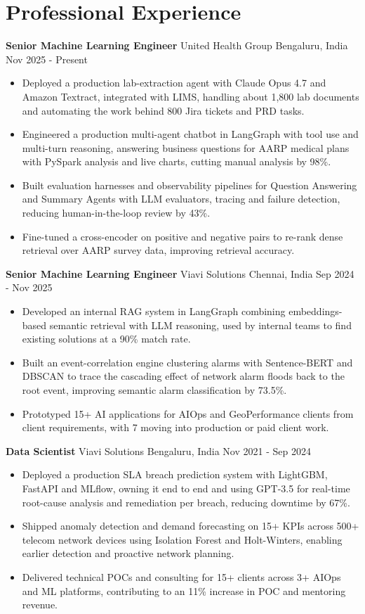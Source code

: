 \documentclass[10pt,a4paper]{article}
\newcommand{\role}[4]{\textbf{#1} \textbar{} #2 \hfill #3 \textbar{} #4\par}
\begin{document}
\section{Professional Experience}
\role{Senior Machine Learning Engineer}{United Health Group}{Bengaluru, India}{Nov 2025 - Present}
\begin{itemize}
  \item Deployed a production lab-extraction agent with Claude Opus 4.7 and Amazon Textract, integrated with LIMS, handling about 1,800 lab documents and automating the work behind 800 Jira tickets and PRD tasks.
  \item Engineered a production multi-agent chatbot in LangGraph with tool use and multi-turn reasoning, answering business questions for AARP medical plans with PySpark analysis and live charts, cutting manual analysis by 98\%.
  \item Built evaluation harnesses and observability pipelines for Question Answering and Summary Agents with LLM evaluators, tracing and failure detection, reducing human-in-the-loop review by 43\%.
  \item Fine-tuned a cross-encoder on positive and negative pairs to re-rank dense retrieval over AARP survey data, improving retrieval accuracy.
\end{itemize}
\vspace{3pt}
\role{Senior Machine Learning Engineer}{Viavi Solutions}{Chennai, India}{Sep 2024 - Nov 2025}
\begin{itemize}
  \item Developed an internal RAG system in LangGraph combining embeddings-based semantic retrieval with LLM reasoning, used by internal teams to find existing solutions at a 90\% match rate.
  \item Built an event-correlation engine clustering alarms with Sentence-BERT and DBSCAN to trace the cascading effect of network alarm floods back to the root event, improving semantic alarm classification by 73.5\%.
  \item Prototyped 15+ AI applications for AIOps and GeoPerformance clients from client requirements, with 7 moving into production or paid client work.
\end{itemize}
\vspace{3pt}
\role{Data Scientist}{Viavi Solutions}{Bengaluru, India}{Nov 2021 - Sep 2024}
\begin{itemize}
  \item Deployed a production SLA breach prediction system with LightGBM, FastAPI and MLflow, owning it end to end and using GPT-3.5 for real-time root-cause analysis and remediation per breach, reducing downtime by 67\%.
  \item Shipped anomaly detection and demand forecasting on 15+ KPIs across 500+ telecom network devices using Isolation Forest and Holt-Winters, enabling earlier detection and proactive network planning.
  \item Delivered technical POCs and consulting for 15+ clients across 3+ AIOps and ML platforms, contributing to an 11\% increase in POC and mentoring revenue.
\end{itemize}
\end{document}
